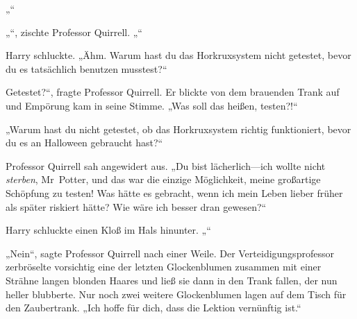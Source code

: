 „“

„“, zischte Professor Quirrell. „“

Harry schluckte.
„Ähm. Warum hast du das Horkruxsystem nicht getestet, bevor du es tatsächlich benutzen musstest?“

Getestet?“, fragte Professor Quirrell.
Er blickte von dem brauenden Trank auf und Empörung kam in seine Stimme.
„Was soll das heißen, testen?!“

„Warum hast du nicht getestet, ob das Horkruxsystem richtig funktioniert, bevor du es an Halloween gebraucht hast?“

Professor Quirrell sah angewidert aus.
„Du bist lächerlich—ich wollte nicht \emph{sterben}, Mr~Potter, und das war die einzige Möglichkeit, meine großartige Schöpfung zu testen! Was hätte es gebracht, wenn ich mein Leben lieber früher als später riskiert hätte? Wie wäre ich besser dran gewesen?“

Harry schluckte einen Kloß im Hals hinunter.
„“

„Nein“, sagte Professor Quirrell nach einer Weile.
Der Verteidigungsprofessor zerbröselte vorsichtig eine der letzten Glockenblumen zusammen mit einer Strähne langen blonden Haares und ließ sie dann in den Trank fallen, der nun heller blubberte. Nur noch zwei weitere Glockenblumen lagen auf dem Tisch für den Zaubertrank.
„Ich hoffe für dich, dass die Lektion vernünftig ist.“

